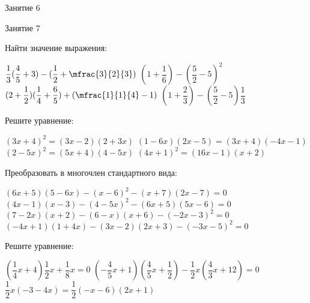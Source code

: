 \begin{class}[number=6]
	\begin{listofex}
		\item Занятие 6
	\end{listofex}
\end{class}

\begin{class}[number=7]
	\begin{listofex}
		\item Занятие 7
	\end{listofex}
\end{class}

\begin{homework}[number=1]
	\begin{listofex}
		\item Найти значение выражения:
		\begin{itasks}[1]
			\task \( \dfrac{1}{3}(\dfrac{4}{5}+3)-(\dfrac{1}{2}+\mfrac{3}{2}{3}) \)
			\task \( (1+\dfrac{1}{6})-(\dfrac{5}{2}-5)^2 \)
			\task \( (2+\dfrac{1}{2})(\dfrac{1}{4}+\dfrac{6}{5})+(\mfrac{1}{1}{4}-1) \)
			\task \( (1+\dfrac{2}{3})-(\dfrac{5}{2}-5)\dfrac{1}{3} \)
		\end{itasks}
		\item Решите уравнение:
		\begin{itasks}[1]
			\task \( (3x+4)^2=(3x-2)(2+3x) \)
			\task \( (1-6x)(2x-5)=(3x+4)(-4x-1) \)
			\task \( (2-5x)^2=(5x+4)(4-5x)\)
			\task \( (4x+1)^2=(16x-1)(x+2) \)
		\end{itasks}
		\item Преобразовать в многочлен стандартного вида:
		\begin{itasks}[1]
			\task \( (6x+5)(5-6x)-(x-6)^2-(x+7)(2x-7)=0 \)
			\task \( (4x-1)(x-3)-(4-5x)^2-(6x+5)(5x-6)=0 \)
			\task \( (7-2x)(x+2)-(6-x)(x+6)-(-2x-3)^2=0 \)
			\task \( (-4x+1)(1+4x)-(3x-2)(2x+3)-(-3x-5)^2=0 \)
		\end{itasks}
		\item Решите уравнение:
		\begin{itasks}[1]
			\task \( (\dfrac{1}{4}x+4)\dfrac{1}{2}x+\dfrac{1}{8}x=0 \)
			\task \( (-\dfrac{4}{5}x+1)(\dfrac{4}{5}x+\dfrac{1}{2})- \dfrac{1}{2}x (\dfrac{4}{3}x+12)=0 \)
			\task \( \dfrac{1}{2}x(-3-4x)=\dfrac{1}{2}(-x-6)(2x+1) \)
		\end{itasks} 
	\end{listofex}
\end{homework}


